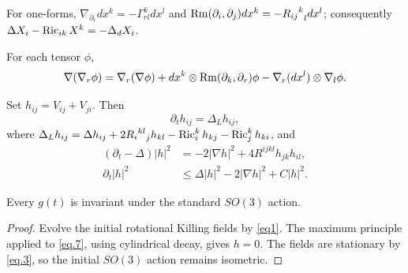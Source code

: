 \begin{remark}
\label{rem:covariant-derivative-one-forms}

For one-forms, $\nabla_{\partial_r}dx^k=-\Gamma^k_{rl}dx^l$ and
$\operatorname{Rm}(\partial_i,\partial_j)dx^k=-{{R_{ij}}^k}_l dx^l$; consequently
$\Delta X_i-\operatorname{Ric}_{ik}X^k=-\Delta_dX_i$.
\end{remark}

\begin{claim}
\label{claim:commuting-covariant-derivatives}

For each tensor $\phi$,
\[\nabla(\nabla_r\phi)=\nabla_r(\nabla\phi)+dx^k\otimes
\operatorname{Rm}(\partial_k,\partial_r)\phi-\nabla_r(dx^l)\otimes\nabla_l\phi.\]
\end{claim}

Set $h_{ij}=V_{ij}+V_{ji}$. Then
\begin{equation}\label{eq.5}\partial_th_{ij}=\Delta_Lh_{ij},\end{equation}
where $\Delta_Lh_{ij}=\Delta h_{ij}+2{{R_i}^{kl}}_jh_{kl}-\operatorname{Ric}_i^kh_{kj}-\operatorname{Ric}_j^kh_{ki}$, and
\begin{align}
 (\partial_t-\Delta)|h|^2&=-2|\nabla h|^2+4R^{ijkl}h_{jk}h_{il},\label{eq.6}\\
 \partial_t|h|^2&\le\Delta|h|^2-2|\nabla h|^2+C|h|^2.\label{eq.7}
\end{align}

\begin{corollary}
\label{cor:standard-solution-rotationally-symmetric}

Every $g(t)$ is invariant under the standard $SO(3)$ action.
\end{corollary}
\begin{proof}
\sketch Evolve the initial rotational Killing fields by \eqref{eq1}.
The maximum principle applied to \eqref{eq.7}, using cylindrical decay,
gives $h=0$. The fields are stationary by \eqref{eq.3}, so the initial
$SO(3)$ action remains isometric.
\end{proof}

